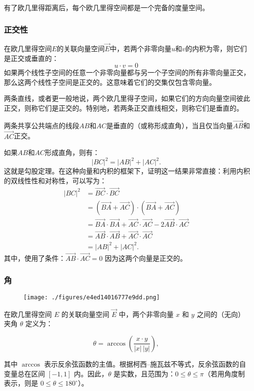 有了欧几里得距离后，每个欧几里得空间都是一个完备的度量空间。
\subsubsection{正交性}
在欧几里得空间$E$的关联向量空间$\overrightarrow{E}$中，若两个非零向量$u$和$v$的内积为零，则它们是正交或垂直的：
$$
u \cdot v = 0~
$$
如果两个线性子空间的任意一个非零向量都与另一个子空间的所有非零向量正交，那么这两个线性子空间是正交的。这意味着它们的交集仅包含零向量。

两条直线，或者更一般地说，两个欧几里得子空间，如果它们的方向向量空间彼此正交，则称它们是正交的。特别地，若两条正交直线相交，则称它们是垂直的。

两条共享公共端点的线段$AB$和$AC$是垂直的（或称形成直角），当且仅当向量$\overrightarrow{AB}$和$\overrightarrow{AC}$正交。

如果$AB$和$AC$形成直角，则有：
$$
|BC|^2 = |AB|^2 + |AC|^2.~
$$
这就是勾股定理。在这种向量和内积的框架下，证明这一结果非常直接：利用内积的双线性性和对称性，可以写为：
$$
\begin{aligned}
|BC|^2 
&= \overrightarrow{BC} \cdot \overrightarrow{BC} \\[4pt]
&= (\overrightarrow{BA} + \overrightarrow{AC}) \cdot (\overrightarrow{BA} + \overrightarrow{AC}) \\[4pt]
&= \overrightarrow{BA} \cdot \overrightarrow{BA} + \overrightarrow{AC} \cdot \overrightarrow{AC} - 2 \overrightarrow{AB} \cdot \overrightarrow{AC} \\[4pt]
&= \overrightarrow{AB} \cdot \overrightarrow{AB} + \overrightarrow{AC} \cdot \overrightarrow{AC} \\[4pt]
&= |AB|^2 + |AC|^2.
\end{aligned}~
$$
其中，使用了条件：$\overrightarrow{AB} \cdot \overrightarrow{AC} = 0$
因为这两个向量是正交的。
\subsubsection{角}
\begin{figure}[ht]
\centering
\texttt{[image: ./figures/e4ed14016777e9dd.png]}
\caption{} \label{fig_OJLDkj_3}
\end{figure}
在欧几里得空间 $E$ 的关联向量空间 $\overrightarrow{E}$ 中，两个非零向量 $x$ 和 $y$ 之间的\*\*（无向）夹角\*\* $\theta$ 定义为：

$$
\theta = \arccos\!\left(\frac{x \cdot y}{|x|\,|y|}\right),~
$$

其中 $\arccos$ 表示反余弦函数的主值。根据柯西–施瓦兹不等式，反余弦函数的自变量总在区间 $[-1, 1]$ 内。因此，$\theta$ 是实数，且范围为：$0 \leq \theta \leq \pi$（若用角度制表示，则是 $0 \leq \theta \leq 180^\circ$）。

